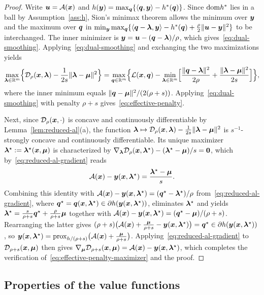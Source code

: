 \begin{proof}
Write \(\bm{u}=\mathcal{A}(\bm{x})\) and \(h(\bm{y})=\max_{\bm{q}}\{\langle\bm{q},\bm{y}\rangle-h^*(\bm{q})\}\).
Since \(\mathrm{dom} h^*\) lies in a ball by Assumption~\ref{ass:h}, Sion's minimax
theorem allows the minimum over \(\bm{y}\) and the maximum over \(\bm{q}\) in
\(\min_{\bm{y}}\max_{\bm{q}}\{\langle\bm{q}-\bm{\lambda},\bm{y}\rangle-h^*(\bm{q})
+\frac{\rho}{2}\|\bm{u}-\bm{y}\|^2\}\) to be interchanged. The inner minimizer is
\(\bm{y}=\bm{u}-(\bm{q}-\bm{\lambda})/\rho\), which gives~\eqref{eq:dual-smoothing}.
Applying~\eqref{eq:dual-smoothing} and exchanging the two maximizations yields
\[
    \max_{\bm{\lambda}\in\mathbb{R}^m}\Bigl\{\mathcal{D}_\rho(\bm{x},\bm{\lambda})
    -\frac{1}{2s}\|\bm{\lambda}-\bm{\mu}\|^2\Bigr\}
    =\max_{\bm{q}\in\mathbb{R}^m}\Bigl\{\mathcal{L}(\bm{x},\bm{q})
    -\min_{\bm{\lambda}\in\mathbb{R}^m}\Bigl[\frac{\|\bm{q}-\bm{\lambda}\|^2}{2\rho}
    +\frac{\|\bm{\lambda}-\bm{\mu}\|^2}{2s}\Bigr]\Bigr\},
\]
where the inner minimum equals \(\|\bm{q}-\bm{\mu}\|^2/(2(\rho+s))\).
Applying~\eqref{eq:dual-smoothing} with penalty \(\rho+s\)
gives~\eqref{eq:effective-penalty}.

Next, since \(\mathcal{D}_\rho(\bm{x},\cdot)\) is concave and continuously
differentiable by Lemma~\ref{lem:reduced-al}(a), the function
\(\bm{\lambda}\mapsto\mathcal{D}_\rho(\bm{x},\bm{\lambda})-\frac{1}{2s}\|\bm{\lambda}-\bm{\mu}\|^2\) is
\(s^{-1}\)-strongly concave and continuously differentiable. Its unique
maximizer \(\bm{\lambda}^\star:=\bm{\lambda}^\star(\bm{x},\bm{\mu})\) is characterized by
\(\nabla_{\bm{\lambda}}\mathcal{D}_\rho(\bm{x},\bm{\lambda}^\star)-(\bm{\lambda}^\star-\bm{\mu})/s=\bm{0}\),
which by~\eqref{eq:reduced-al-gradient} reads
\[
    \mathcal{A}(\bm{x})-\bm{y}(\bm{x},\bm{\lambda}^\star)=\frac{\bm{\lambda}^\star-\bm{\mu}}{s}.
\]
Combining this identity with
\(\mathcal{A}(\bm{x})-\bm{y}(\bm{x},\bm{\lambda}^\star)=(\bm{q}^\star-\bm{\lambda}^\star)/\rho\)
from~\eqref{eq:reduced-al-gradient}, where
\(\bm{q}^\star=\bm{q}(\bm{x},\bm{\lambda}^\star)\in\partial h(\bm{y}(\bm{x},\bm{\lambda}^\star))\),
eliminates \(\bm{\lambda}^\star\) and yields
\(\bm{\lambda}^\star=\frac{s}{\rho+s}\bm{q}^\star+\frac{\rho}{\rho+s}\bm{\mu}\) together
with \(\mathcal{A}(\bm{x})-\bm{y}(\bm{x},\bm{\lambda}^\star)=(\bm{q}^\star-\bm{\mu})/(\rho+s)\).
Rearranging the latter gives
\((\rho+s)\bigl(\mathcal{A}(\bm{x})+\frac{\bm{\mu}}{\rho+s}-\bm{y}(\bm{x},\bm{\lambda}^\star)\bigr)
=\bm{q}^\star\in\partial h(\bm{y}(\bm{x},\bm{\lambda}^\star))\), so
\(\bm{y}(\bm{x},\bm{\lambda}^\star)=\mathrm{prox}_{h/(\rho+s)}\bigl(\mathcal{A}(\bm{x})+\frac{\bm{\mu}}{\rho+s}\bigr)\).
Applying~\eqref{eq:reduced-al-gradient} to \(\mathcal{D}_{\rho+s}(\bm{x},\bm{\mu})\) then
gives
\(\nabla_{\bm{\mu}}\mathcal{D}_{\rho+s}(\bm{x},\bm{\mu})=\mathcal{A}(\bm{x})-\bm{y}(\bm{x},\bm{\lambda}^\star)\),
which completes the verification of~\eqref{eq:effective-penalty-maximizer} and
the proof.
\end{proof}
\fi

\subsection{Properties of the value functions}

